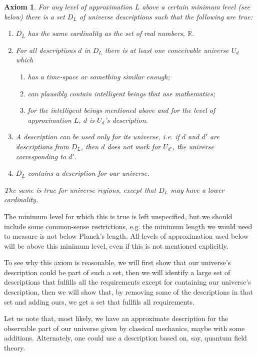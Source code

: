 \documentclass[a4paper
,draft
]{article}
\def\reale{\mathbb{R}}
\def\descriptions{D_L}
\newtheorem{axiom}{Axiom}
\begin{document}
\begin{axiom}\label{ax:uncountable}
  For any level of approximation $L$ above a certain minimum level (see below)
  there is a set $\descriptions$
  of universe descriptions such that the following are true:
  \begin{enumerate}
    \item $\descriptions$ has the same cardinality as
          the set of real numbers, $\reale$.
    \item For all descriptions $d$ in $\descriptions$
          there is at least one conceivable
          universe $U_d$ which
      \begin{enumerate}
        \item has a time-space or something similar enough;
        \item can plausibly contain intelligent beings that use mathematics;
        \item for the intelligent beings mentioned above and
              for the level of approximation $L$,
              $d$ is $U_d$'s description.
      \end{enumerate}
    \item A description can be used only for its universe, i.e.
          if $d$ and $d'$ are descriptions from $\descriptions$,
          then $d$ does not work
          for $U_{d'}$, the universe corresponding to $d'$.
    \item $\descriptions$ contains a description for our universe.
  \end{enumerate}
  The same is true for universe regions, except that
  $\descriptions$ may have a lower
  cardinality.
\end{axiom}

The minimum level for which this is true is left unspecified, but we should
include some common-sense restrictions, e.g. the minimum length we would
need to measure is not below Planck's length.
All levels of approximation used below will be above this
minimum level, even if this is not mentioned explicitly.

To see why this axiom is reasonable, we will first show that our universe's
description could be part of such a set, then we will identify a large set
of descriptions that fulfills all the requirements except for containing
our universe's description, then we will show that, by removing some of the
descriptions in that set and adding ours, we get a set that fullfils all
requirements.

Let us note that,
most likely, we have an approximate description for the observable part
of our universe
given by classical mechanics, maybe with some additions.
Alternately, one could use a description based on, say, quantum field theory.
\end{document}
